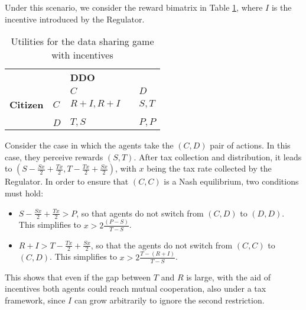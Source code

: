 Under this scenario, we consider the reward bimatrix in Table \ref{tab:payoffIPD_inc}, 
where $I$ is the incentive introduced by the Regulator. 

 \begin{table}[h!]
    \begin{center}
    \begin{tabular}{cl|lll}
    \multicolumn{1}{l}{}                                   &     & \multicolumn{3}{l}{\textbf{DDO}} \\ \cline{3-5} 
    \multicolumn{1}{l}{}                                   &     & $C$         &       & $D$        \\ \hline
    \multicolumn{1}{c|}{\textbf{Citizen}} & $C$ & $R+I,R+I$       &       & $S,T$      \\
    \multicolumn{1}{c|}{}                                  &     &             &       &            \\
    \multicolumn{1}{c|}{}                                  & $D$ & $T,S$       &       & $P,P$     
    \end{tabular} 
    \end{center}
    \caption{Utilities for the data sharing game with incentives}
    \label{tab:payoffIPD_inc}
    \vspace{-2ex}
    \end{table}

Consider the case in which the agents take 
the $(C, D)$ pair of actions. In this case, they perceive rewards $(S, T)$.
After tax collection and distribution, it leads to
$(S - \frac{Sx}{2} +  \frac{Tx}{2}, T -  \frac{Tx}{2} +  \frac{Sx}{2})$, with $x$ being the tax rate collected by the Regulator. In order to ensure 
that $(C,C)$ is a Nash equilibrium, two conditions must hold:
\begin{itemize}
    \item $S - \frac{Sx}{2} +  \frac{Tx}{2} > P$, so that agents do not 
    switch from $(C,D)$ to $(D,D)$. This simplifies to $x > 2\frac{(P-S)}{T-S}$.
    \item $R + I > T -  \frac{Tx}{2} +  \frac{Sx}{2}$, so that 
    the agents do not switch from $(C, C)$ to $(C,D)$. This simplifies to $x > 2\frac{T - (R+I)}{T-S}$.
\end{itemize}

This shows that even if the gap between $T$ and $R$ is large, with the
aid of incentives both agents could reach mutual cooperation, also under a tax framework, since $I$ can grow arbitrarily to ignore the second restriction.
